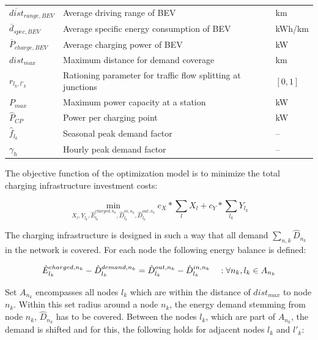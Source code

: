 \begin{scriptsize}
\begin{longtable}{lll}
        $\overline{dist}_{range, BEV}$ & Average driving range of BEV & km \\
        $\overline{d}_{spec, BEV}$ & Average specific energy consumption of BEV & kWh/km \\
        $\overline{P}_{charge, BEV}$ & Average charging power of BEV & kW \\
        $dist_{max}$ & Maximum distance for demand coverage & km \\
        $r_{l_k, l'_k}$ & Rationing parameter for traffic flow splitting at junctions & $[0,1]$ \\
        $P_{max}$ & Maximum power capacity at a station & kW \\
        $\hat{P}_{CP}$ & Power per charging point & kW \\
        $\hat{f}_{l_k}$ & Seasonal peak demand factor & -- \\
        $\gamma_h$ & Hourly peak demand factor & -- \\
        \hline
        \end{longtable}
        \end{scriptsize}

        The objective function of the optimization model is to minimize the total charging infrastructure investment costs: 
        
        \begin{equation}
                \min_{X_{l}, Y_{l_k}, \hat{E}_{l_k}^{charged, n_k}, \hat{D}_{l_k}^{in, n_k}, \hat{D}_{l_k}^{out, n_k}}  c_{X} * \sum_{l} X_{l} + c_{Y} * \sum_{l_k} Y_{l_k}
        \end{equation}
    
    The charging infrastructure is designed in such a way that all demand $\sum_{n, k}\hat{D}_{n_k}$ in the network is covered. For each node the following energy balance is defined:
    
        \begin{equation}
                \hat{E}_{l_k}^{charged,n_k} - \hat{D}_{l_k}^{demand,n_k} =  \hat{D}_{l_k}^{out, n_k} - \hat{D}_{l_k}^{in, n_k} \quad : \forall n_k, l_k \in A_{n_k}\\
        \end{equation}
    
    Set $A_{n_k}$ encompasses all nodes $l_k$ which are within the distance of $dist_{max}$ to node $n_k$. Within this set radius around a node $n_k$, the energy demand stemming from node $n_k$, $\hat{D}_{n_k}$ has to be covered. Between the nodes $l_k$, which are part of $A_{n_k}$, the demand is shifted and for this, the following holds for adjacent nodes $l_k$ and $l'_k$:
    

